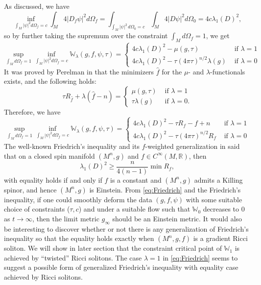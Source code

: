 \documentclass{amsart}
\theoremstyle{definition}
\theoremstyle{remark}
\numberwithin{equation}{section}
\newcommand{\abs}[1]{\left|#1\right|}
\newcommand{\R}{\mathbb{R}}
\begin{document}
As discussed, we have
\[\inf_{\int_M \abs{\psi}^2 d\Omega_f = c}\int_M 4\abs{D_f\psi}^2 d\Omega_f = \int_{\int_M \abs{\psi}^2\,d\Omega_0 = c} \int_M 4\abs{D\psi}^2 d\Omega_0 = 4c\lambda_1(D)^2,\]
so by further taking the supremum over the constraint $\int_M d\Omega_f = 1$, we get
\[\sup_{\int_M d\Omega_f = 1} \inf_{\int_M \abs{\psi}^2 d\Omega_f = c} \mathbb{W}_\lambda(g,f,\psi,\tau) = 
\begin{cases}
4c\lambda_1(D)^2 - \mu(g,\tau) & \text{ if } \lambda = 1\\
4c\lambda_1(D)^2 - \tau(4\pi\tau)^{n/2}\lambda(g) & \text{ if } \lambda = 0
\end{cases}
\]
It was proved by Perelman in \cite{Perelman} that the minimizers $\hat{f}$ for the $\mu$- and $\lambda$-functionals exists, and the following holds:
\[\tau R_{\hat{f}} + \lambda(\hat{f}-n) =
\begin{cases}
\mu(g,\tau) & \text{ if } \lambda = 1\\
\tau\lambda(g) & \text{ if } \lambda = 0.
\end{cases}
\]
Therefore, we have
\begin{equation}
\label{eq:Friedrich}
\sup_{\int_M d\Omega_f = 1} \inf_{\int_M \abs{\psi}^2 d\Omega_f = c} \mathbb{W}_\lambda(g,f,\psi,\tau) = 
\begin{cases}
4c\lambda_1(D)^2 - \tau R_f - f + n & \text{ if } \lambda = 1\\
4c\lambda_1(D)^2 - \tau(4\pi\tau)^{n/2}R_f & \text{ if } \lambda = 0
\end{cases}	
\end{equation}
The well-known Friedrich's inequality \cite{Frd80} and its $f$-weighted generalization in \cite{BO22} said that on a closed spin manifold $(M^n,g)$ and $f \in C^\infty(M,\R)$, then
\[\lambda_1(D)^2 \geq \frac{n}{4(n-1)}\min R_f,\]
with equality holds if and only if $f$ is a constant and $(M^n,g)$ admits a Killing spinor, and hence $(M^n,g)$ is Einstein. From \eqref{eq:Friedrich} and the Friedrich's inequality, if one could smoothly deform the data $(g,f,\psi)$ with some suitable choice of constraints ($\tau, c$) and under a suitable flow such that $\mathbb{W}_0$ decreases to $0$ as $t \to \infty$, then the limit metric $g_\infty$ should be an Einstein metric. It would also be interesting to discover whether or not there is any generalization of Friedrich's inequality so that the equality holds exactly when $(M^n,g,f)$ is a gradient Ricci soliton. We will show in later section that the constraint critical point of $\mathbb{W}_1$ is achieved by ``twisted'' Ricci solitons.  The case $\lambda = 1$ in \eqref{eq:Friedrich} seems to suggest a possible form of generalized Friedrich's inequality with equality case achieved by Ricci solitons.
\end{document}
